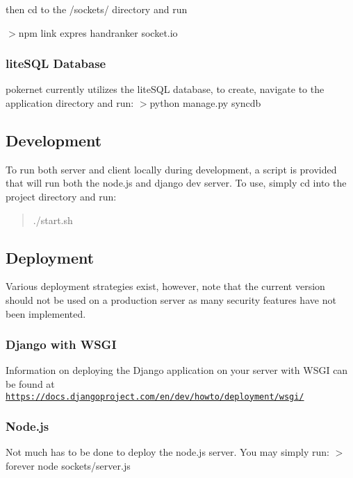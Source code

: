 then cd to the /sockets/ directory and run

$>$npm link expres handranker socket.\+io

\subsubsection*{lite\+S\+Q\+L Database}

pokernet currently utilizes the lite\+S\+Q\+L database, to create, navigate to the application directory and run\+: $>$python manage.\+py syncdb

\subsection*{Development}

To run both server and client locally during development, a script is provided that will run both the node.\+js and django dev server. To use, simply cd into the project directory and run\+: \begin{quote}
./start.sh \end{quote}


\subsection*{Deployment}

Various deployment strategies exist, however, note that the current version should not be used on a production server as many security features have not been implemented.

\subsubsection*{Django with W\+S\+G\+I}

Information on deploying the Django application on your server with W\+S\+G\+I can be found at \href{https://docs.djangoproject.com/en/dev/howto/deployment/wsgi/}{\tt https\+://docs.\+djangoproject.\+com/en/dev/howto/deployment/wsgi/}

\subsubsection*{Node.\+js}

Not much has to be done to deploy the node.\+js server. You may simply run\+: $>$forever node sockets/server.\+js 